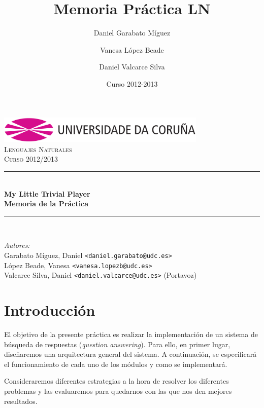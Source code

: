 \documentclass[12pt,a4paper,titlepage]{article}
\author{
	Daniel Garabato Míguez
	\and Vanesa López Beade
	\and Daniel Valcarce Silva
}
\title{Memoria Práctica LN}
\date{Curso 2012-2013}
\newcommand{\HRule}{\rule{\linewidth}{0.5mm}}
\begin{document}
\begin{titlepage}
\begin{center}
\includegraphics[width=10cm]{res/logo_udc}\\
\vspace{1cm}
\textsc{\Large Lenguajes Naturales}\\[0.5cm]
\textsc{\Large Curso 2012/2013}\\[0.5cm]

\HRule \\[0.4cm]
{ \huge \bfseries My Little Trivial Player}\\[0.4cm]
{ \Large \bfseries Memoria de la Práctica}\\[0cm]

\HRule \\[0cm]
\end{center}

\vfill
\emph{Autores:}
\vspace{0.5cm}
\\
\vspace{0.1cm}
Garabato Míguez, Daniel \texttt{<daniel.garabato@udc.es>}\\
\vspace{0.1cm}
López Beade, Vanesa \texttt{<vanesa.lopezb@udc.es>}\\
\vspace{0.1cm}
Valcarce Silva, Daniel \texttt{<daniel.valcarce@udc.es>} (Portavoz)\\

\end{titlepage}


\tableofcontents
\clearpage

\section{Introducción}
El objetivo de la presente práctica es realizar la implementación de un sistema de búsqueda de respuestas (\emph{question answering}). Para ello, en primer lugar, diseñaremos una arquitectura general del sistema. A continuación, se especificará el funcionamiento de cada uno de los módulos y como se implementará.

Consideraremos diferentes estrategias a la hora de resolver los diferentes problemas y las evaluaremos para quedarnos con las que nos den mejores resultados.
\end{document}
